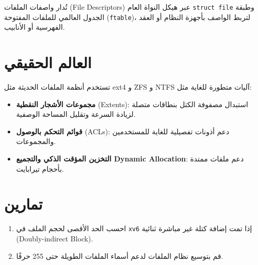 تُدار واصفات الملفات (File Descriptors) عبر هيكل النواة العام \texttt{struct file} وطبقة الجدول العالمي للملفات المفتوحة (\texttt{ftable})، لتربط الواصف بأجهزة النظام أو العقد الفهرسية أو الأنابيب.

\section{العالم الحقيقي}
\label{sec:real_world_fs}

تستخدم أنظمة الملفات الحديثة مثل ext4 و ZFS و NTFS آليات متطورة للغاية مثل:
\begin{itemize}
  \item \textbf{مجموعات الأشجار النقطية} (Extents): استبدال مصفوفة الكتل بنطاقات متصلة لزيادة السرعة وتقليل المساحة الوصفية.
  \item \textbf{قوائم التحكم بالوصول} (ACLs): دعم أذونات تفصيلية للغاية للمستخدمين والمجموعات.
  \item \textbf{التخزين المؤقت الذكي والتجميع Dynamic Allocation}: دعم ملفات ممتدة بأحجام تيرابايت.
\end{itemize}

\section{تمارين}
\label{sec:exercises_fs}

\begin{enumerate}
  \item احسب الحد الأقصى لحجم الملف في \texttt{xv6} إذا تمت إضافة كتلة غير مباشرة ثنائية (Doubly-indirect Block).
  \item قم بتوسيع نظام الملفات لدعم أسماء الملفات الطويلة حتى 255 حرفًا.
\end{enumerate}
